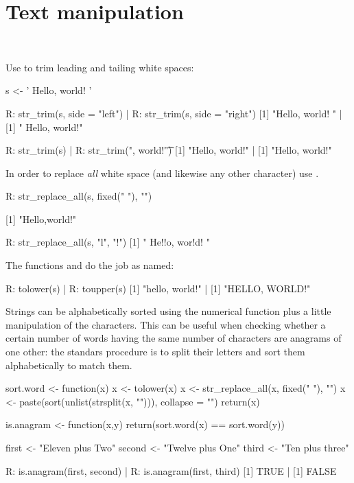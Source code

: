 \section{Text manipulation}\label{sec: text}
\\
\bigskip 

Use  to trim leading and 
tailing white spaces:
\begin{example}
s <- ' Hello, world! '

R: str_trim(s, side = "left") | R: str_trim(s, side = "right")
[1] "Hello, world! "          | [1] " Hello, world!"

R: str_trim(s)                | R: str_trim("\n\nHello, world!\t")
[1] "Hello, world!"           | [1] "Hello, world!"
\end{example}
In order to replace \emph{all} white space (and likewise
any other character) use .
\begin{example}
R: str_replace_all(s, fixed(" "), "") 

[1] "Hello,world!"

R: str_replace_all(s, "l", "!")
[1] " He!!o, wor!d! "
\end{example}
The functions  and 
do the job as named:
\begin{example}
R: tolower(s)         | R: toupper(s)
[1] "hello, world!"   | [1] "HELLO, WORLD!"
\end{example}
Strings can be alphabetically sorted using the 
 numerical function plus a little manipulation
of the characters. This can be useful when checking
whether a certain number of words having the same number
of characters are anagrams of one other: the standars
procedure is to split their letters and sort them
alphabetically to match them. 
\begin{example}
sort.word <- function(x){
 x <- tolower(x)
 x <- str_replace_all(x, fixed(" "), "")    
 x <- paste(sort(unlist(strsplit(x, ""))), collapse = "") 
 return(x)
}

is.anagram <- function(x,y){
    return(sort.word(x) == sort.word(y))
}

first  <- "Eleven plus Two"
second <- "Twelve plus One"
third  <- "Ten plus three"

R: is.anagram(first, second)    | R: is.anagram(first, third)
[1] TRUE                        | [1] FALSE                        
\end{example}

